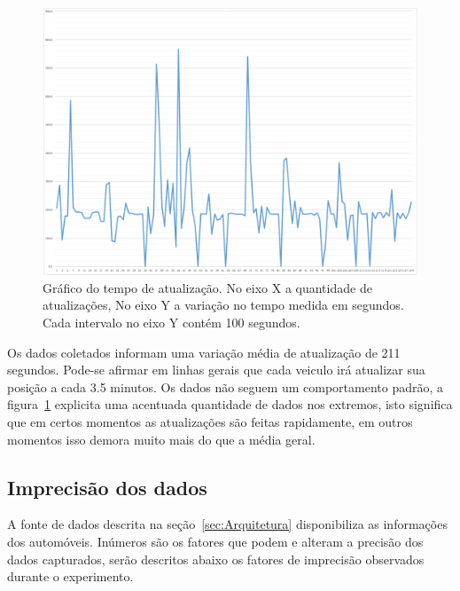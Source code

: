 \documentclass[12pt]{article}
\begin{document}
\begin{figure}[ht]
\centering
\includegraphics[width=.75\textwidth]{./Resources/GraficoTempo.PNG}
\caption{Gráfico do tempo de atualização. No eixo X a quantidade de atualizações, No eixo Y a variação no tempo medida em segundos. Cada intervalo no eixo Y contém 100 segundos.}
\label{fig:graficoVariacao}
\end{figure}

Os dados coletados informam uma variação média de atualização de 211 segundos. Pode-se afirmar em linhas gerais que cada veiculo irá atualizar sua posição a cada 3.5 minutos. Os dados não seguem um comportamento padrão, a figura~\ref{fig:graficoVariacao} explicita uma acentuada quantidade de dados nos extremos, isto significa que em certos momentos as atualizações são feitas rapidamente, em outros momentos isso demora muito mais do que a média geral.

\subsection{Imprecisão dos dados} \label{sec:imprecisao}
A fonte de dados descrita na seção~\ref{sec:Arquitetura} disponibiliza as informações dos automóveis. Inúmeros são os fatores que podem e alteram a precisão dos dados capturados, serão descritos abaixo os fatores de imprecisão observados durante o experimento.
\end{document}
